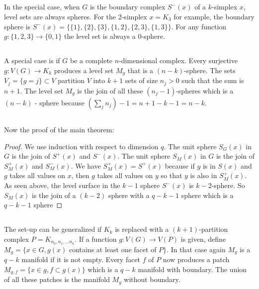 \documentclass[12pt]{amsart}
\let\paragraph\subsection
\begin{document}
\paragraph{}
In the special case, when $G$ is the boundary complex $S^-(x)$ of 
a $k$-simplex $x$, level sets are always spheres. 
For the 2-simplex $x=K_3$ for example, the boundary sphere is
$S^-(x)=\{ \{1\},\{2\},\{3\},\{1,2\},\{2,3\},\{1,3\}\}$.
For any function $g: \{1,2,3\} \to \{0,1\}$ the level set is always a $0$-sphere. 

\paragraph{}
A special case is if $G$ be a complete $n$-dimensional complex. Every surjective
$g:V(G) \to K_k$ produces a level set $M_g$ that is a $(n-k)$-sphere. 
The sets $V_j = \{ g=j \} \subset V$ partition $V$ into $k+1$ sets of size $n_j>0$ such that the sum is $n+1$.
The level set $M_g$ is the join of all these $(n_j-1)$-spheres which is a $(n-k)$ - sphere
because $(\sum_j n_j)-1= n+1- k-1 = n-k$. 

\paragraph{}
Now the proof of the main theorem:

\begin{proof}
We use induction with respect to dimension $q$.
The unit sphere $S_G(x)$ in $G$ is the join of $S^+(x)$ and $S^-(x)$. 
The unit sphere $S_M(x)$ in $G$ is the join of $S_M^+(x)$ and $S_M^-(x)$. 
We have $S_M^+(x)=S^+(x)$ because if $y$ is in $S(x)$ and $g$ takes all values
on $x$, then $g$ takes all values on $y$ so that $y$ is also in $S_M^+(x)$. 
As seen above, the level surface in the $k-1$ sphere $S^-(x)$ is $k-2$-sphere. 
So $S_M(x)$ is the join of a $(k-2)$ sphere with a $q-k-1$ sphere which is a
$q-k-1$ sphere
\end{proof}

\paragraph{}
The set-up can be generalized if $K_k$ is replaced with a $(k+1)$-partition complex
$P=K_{n_0,n_1, \dots n_k}$. If a function $g:V(G) \to V(P)$ is given, define
$M_g = \{ x \in G, g(x)$ contains at least one facet of $P \}$. In that case again
$M_g$ is a $q-k$ manifold if it is not empty. Every facet $f$ of $P$ now produces
a patch $M_{g,f} = \{ x \in g, f \subset g(x) \}$ which is a $q-k$ manifold with 
boundary. The union of all these patches is the manifold $M_g$ without boundary. 
\end{document}

